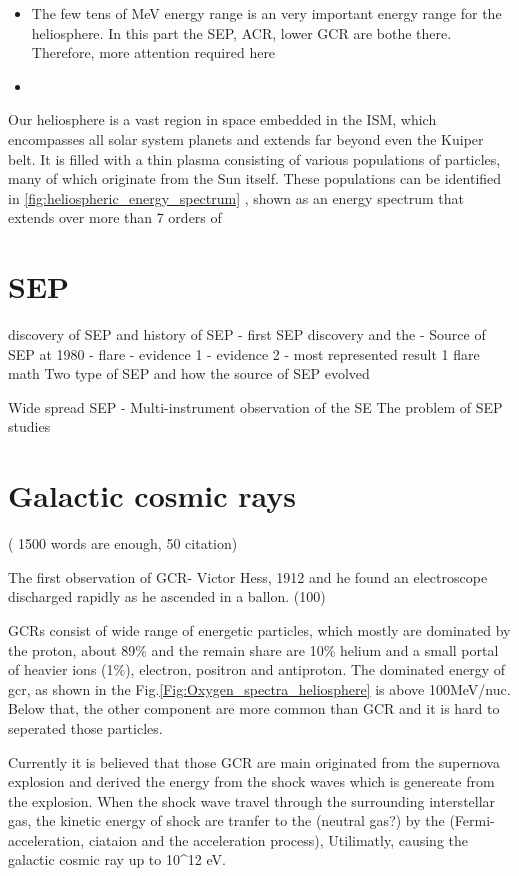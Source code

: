 \begin{itemize}
	\item The few tens of MeV energy range is an very important energy range for the heliosphere. In this part the SEP, ACR, lower GCR are bothe there. Therefore, more attention required here
	\item 
\end{itemize}

Our heliosphere is a vast region in space embedded in the \ac{ISM}, which encompasses all solar system planets and extends far beyond even the Kuiper belt. 
It is filled with a thin plasma consisting of various populations of particles, many of which originate from the Sun itself. These populations can be identified in \autoref{fig:heliospheric_energy_spectrum} \citep[based on measurements by][]{Mewaldt-2001}, shown as an energy spectrum that extends over more than 7 orders of 

\section{SEP}

discovery of SEP and history of SEP
- first SEP discovery and the 
-  Source of SEP at 1980 - flare
 - evidence 1
 - evidence 2
 - most represented result 1
flare math
Two type of SEP and how the source of SEP evolved

Wide spread SEP
	- 
Multi-instrument observation of the SE
The problem of SEP studies



\section{Galactic cosmic rays} ( 1500 words are enough, 50 citation)


The first observation of GCR- Victor Hess, 1912 and he found an electroscope discharged rapidly as he ascended in a ballon.
  (100)
  

GCRs consist of wide range of energetic particles,  which mostly are dominated by the proton, about 89\%  and the remain share are 10\% helium and a small portal of heavier ions (1\%), electron, positron and antiproton. The dominated energy of gcr, as shown in the Fig.\ref{Fig:Oxygen_spectra_heliosphere} is above 100MeV/nuc. Below that, the other component are more common than GCR and it is hard to seperated those particles.

Currently it is believed that those GCR are main originated from the supernova explosion and derived the energy from the shock waves which is genereate from the explosion. When the shock wave travel through the surrounding interstellar gas, the kinetic energy of shock are tranfer to the  (neutral gas?) by the (Fermi-acceleration, ciataion and the acceleration process), Utilimatly, causing the galactic cosmic ray up to 10^12 eV.

